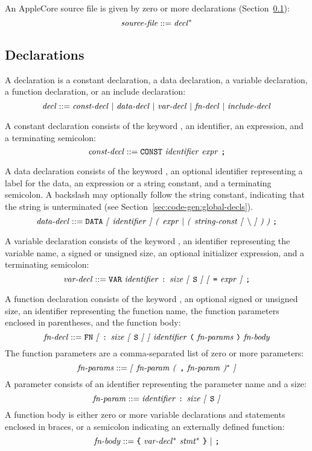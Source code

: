 \documentclass[10pt]{article}
\begin{document}
An AppleCore source file is given by zero or more
declarations (Section~\ref{sec:syntax:decls}):
%
$$\mbox{\textit{source-file}} ::= \mbox{\textit{decl}}^*$$
%

\subsection{Declarations}
\label{sec:syntax:decls}

A declaration is a constant declaration, a data declaration, a
variable declaration, a function declaration, or an include
declaration:
%
$$\mbox{\textit{decl}} ::= \mbox{\ensuremath{\mbox{\textit{const-decl}}} $|$
  \ensuremath{\mbox{\textit{data-decl}}} $|$ \ensuremath{\mbox{\textit{var-decl}}} $|$ \ensuremath{\mbox{\textit{fn-decl}}}
    $|$ \ensuremath{\mbox{\textit{include-decl}}}}$$

 A constant declaration consists of the
keyword , an identifier, an expression, and a terminating
semicolon:
%
$$\mbox{\textit{const-decl}} ::= \mbox{\texttt{CONST} \ensuremath{\mbox{\textit{identifier}}}
  \ensuremath{\mbox{\textit{expr}}} \texttt{;}}$$

 A data declaration consists of the keyword
, an optional identifier representing a label for the data,
an expression or a string constant, and a terminating semicolon.  A
backslash may optionally follow the string constant, indicating that
the string is unterminated (see
Section~\ref{sec:code-gen:global-decls}).
%
$$\nonterm{data-decl} ::= \mbox{\kwd{DATA} \opt{\nonterm{identifier}}
  \group{\nonterm{expr} $|$ \group{\nonterm{string-const} \opt{\bs}}}
  \kwd{;}}$$

 A variable declaration consists of the
keyword , an identifier representing the variable name, a
signed or unsigned size, an optional initializer expression, and a
terminating semicolon:
%
$$\mbox{\textit{var-decl}} ::= \mbox{\texttt{VAR} \ensuremath{\mbox{\textit{identifier}}} \texttt{:}
  \ensuremath{\mbox{\textit{size}}} \textit{[} \texttt{S} \textit{]} \textit{[} \texttt{=} \ensuremath{\mbox{\textit{expr}}} \textit{]} \texttt{;}}$$

 A function declaration consists of the
keyword , an optional signed or unsigned size, an identifier
representing the function name, the function parameters enclosed in
parentheses, and the function body:
%
$$\mbox{\textit{fn-decl}} ::= \mbox{\texttt{FN} \textit{[} \texttt{:} \ensuremath{\mbox{\textit{size}}}
    \textit{[} \texttt{S} \textit{]} \textit{]} \ensuremath{\mbox{\textit{identifier}}} \texttt{(} \ensuremath{\mbox{\textit{fn-params}}}
  \texttt{)} \ensuremath{\mbox{\textit{fn-body}}}}$$
%
The function parameters are a comma-separated list of zero or more
parameters:
%
$$\mbox{\textit{fn-params}} ::= \mbox{\textit{[} \ensuremath{\mbox{\textit{fn-param}}} \textit{(} \texttt{,}
    \ensuremath{\mbox{\textit{fn-param}}} \textit{)}$^*$ \textit{]}}$$
%
A parameter consists of an identifier representing the parameter name
and a size:
%
$$\mbox{\textit{fn-param}} ::= \mbox{\ensuremath{\mbox{\textit{identifier}}} \texttt{:}
  \ensuremath{\mbox{\textit{size}}} \textit{[} \texttt{S} \textit{]}}$$
%
A function body is either zero or more variable declarations and
statements enclosed in braces, or a semicolon indicating an externally
defined function:
%
$$\mbox{\textit{fn-body}} ::= \mbox{\texttt{\{} \ensuremath{\mbox{\textit{var-decl}}}$^*$
  \ensuremath{\mbox{\textit{stmt}}}$^*$ \texttt{\}} $|$ \texttt{;}}$$
\end{document}

